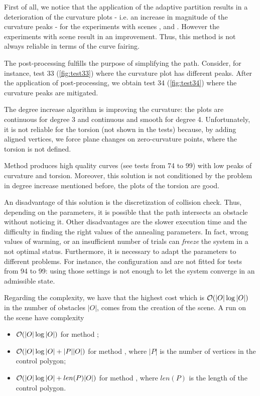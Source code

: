 \documentclass[dissertation.tex]{subfiles}
\begin{document}
First of all, we notice that the application of the adaptive partition
results in a deterioration of the curvature plots - i.e. an increase
in magnitude
of the curvature peaks - for the experiments with scenes \sceneA,
\sceneAb and \sceneB. However the experiments with scene \sceneC result in an
improvement. Thus, this method is not always reliable in terms
of the curve fairing.

The post-processing fulfills the
purpose of simplifying the path. Consider, for instance, test 33
(\cref{fig:test33}) where the curvature plot has different
peaks. After the application of post-processing, we obtain test 34
(\cref{fig:test34}) where the curvature peaks are mitigated.

The degree increase algorithm is improving the
curvature: the plots are continuous for degree 3 and continuous and
smooth for degree 4. Unfortunately, it is not reliable for the torsion
(not shown in the tests) because, by adding aligned vertices, we force
plane changes on zero-curvature points, where the torsion is not
defined.

Method \metC produces high quality curves (see tests from 74 to 99)
with low peaks of curvature and torsion. Moreover, this solution is
not conditioned by the problem in degree increase mentioned before,
the plots of the torsion are good.

An disadvantage of this
solution is the discretization of collision check. Thus,
depending on the parameters, it is possible that the path intersects
an obstacle without noticing it.
Other disadvantages are the slower
execution time and the difficulty in finding the right values of the
annealing parameters. In fact, wrong values of warming, or an
insufficient number of
trials can \emph{freeze} the system in a not optimal
status. Furthermore, it is necessary to adapt the parameters to
different problems. For instance, the configuration \annB and \annC are
not fitted for tests from 94 to 99: using those settings is not enough
to let the system converge in an admissible state.

Regarding the complexity, we have that the highest cost which is
$\mathcal{O}(|O|\log|O|)$ in the number of obstacles $|O|$, comes from the
creation of the scene. A run on the scene have complexity
\begin{itemize}
\item $\mathcal{O}(|O|\log|O|)$ for method \metA;
\item $\mathcal{O}(|O|\log|O|+|P||O|)$ for method \metB, where $|P|$ is the
  number of vertices in the control polygon;
\item $\mathcal{O}(|O|\log|O|+len(P)|O|)$ for method \metC, where $len(P)$
  is the length of the control polygon.
\end{itemize}
\end{document}
